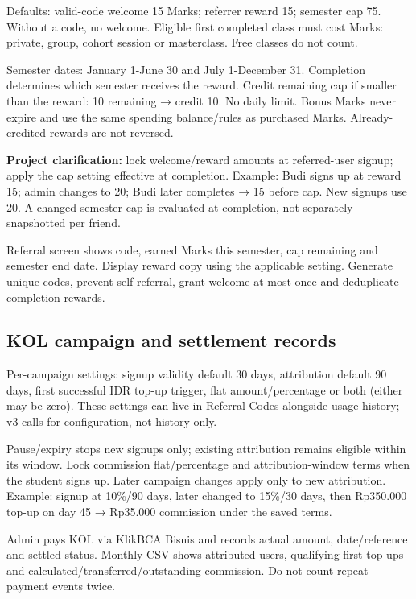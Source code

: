 \documentclass[11pt,a4paper]{article}
\begin{document}
Defaults: valid-code welcome 15 Marks; referrer reward 15; semester cap 75. Without a code, no welcome. Eligible first completed class must cost Marks: private, group, cohort session or masterclass. Free classes do not count.

Semester dates: January 1-June 30 and July 1-December 31. Completion determines which semester receives the reward. Credit remaining cap if smaller than the reward: 10 remaining → credit 10. No daily limit. Bonus Marks never expire and use the same spending balance/\allowbreak{}rules as purchased Marks. Already-credited rewards are not reversed.

\textbf{Project clarification:} lock welcome/\allowbreak{}reward amounts at referred-user signup; apply the cap setting effective at completion. Example: Budi signs up at reward 15; admin changes to 20; Budi later completes → 15 before cap. New signups use 20. A changed semester cap is evaluated at completion, not separately snapshotted per friend.

Referral screen shows code, earned Marks this semester, cap remaining and semester end date. Display reward copy using the applicable setting. Generate unique codes, prevent self-referral, grant welcome at most once and deduplicate completion rewards.

\subsection*{KOL campaign and settlement records}

Per-campaign settings: signup validity default 30 days, attribution default 90 days, first successful IDR top-up trigger, flat amount/\allowbreak{}percentage or both (either may be zero). These settings can live in Referral Codes alongside usage history; v3 calls for configuration, not history only.

Pause/\allowbreak{}expiry stops new signups only; existing attribution remains eligible within its window. Lock commission flat/\allowbreak{}percentage and attribution-window terms when the student signs up. Later campaign changes apply only to new attribution. Example: signup at 10\%/\allowbreak{}90 days, later changed to 15\%/\allowbreak{}30 days, then Rp350.000 top-up on day 45 → Rp35.000 commission under the saved terms.

Admin pays KOL via KlikBCA Bisnis and records actual amount, date/\allowbreak{}reference and settled status. Monthly CSV shows attributed users, qualifying first top-ups and calculated/\allowbreak{}transferred/\allowbreak{}outstanding commission. Do not count repeat payment events twice.
\end{document}
